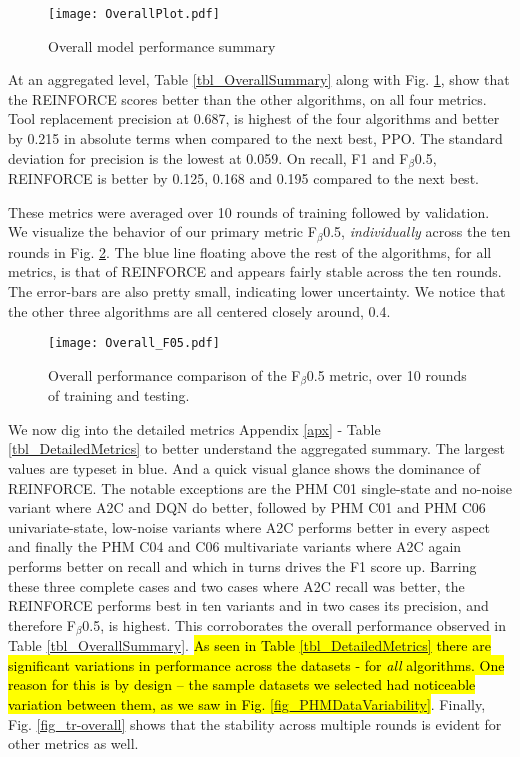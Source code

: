 \documentclass[referee, sn-mathphys-num]{sn-jnl}
\newcommand{\hlc}[2][cyan!17]{{\colorlet{foo}{#1}\sethlcolor{foo}\hl{#2}}}
\begin{document}
	\begin{figure}[hbt!]
		\centering
		\texttt{[image: OverallPlot.pdf]}  
		\caption{Overall model performance summary}
		\label{fig_OverallSummary}
	\end{figure}
	At an aggregated level, Table {\ref{tbl_OverallSummary}} along with Fig. {\ref{fig_OverallSummary}}, show that the REINFORCE scores better than the other algorithms, on all four metrics. Tool replacement precision at 0.687, is highest of the four algorithms and better by 0.215 in absolute terms when compared to the next best, PPO. The standard deviation for precision is the lowest at 0.059. On recall, F1 and F$_\beta$0.5, REINFORCE is better by 0.125, 0.168 and 0.195 compared to the next best.
	
	These metrics were averaged over 10 rounds of training followed by validation. We visualize the behavior of our primary metric F$_\beta$0.5, \textit{individually} across the ten rounds in Fig. {\ref{fig_FbetaOverall}}. The blue line floating above the rest of the algorithms, for all metrics, is that of REINFORCE and appears fairly stable across the ten rounds. The error-bars are also pretty small, indicating lower uncertainty. We notice that the other three algorithms are all centered closely around, 0.4.
	\begin{figure}[hbt!]
		\centering
		\texttt{[image: Overall\_F05.pdf]}  
		\caption{Overall performance comparison of the F$_\beta$0.5 metric, over 10 rounds of training and testing.}
		\label{fig_FbetaOverall}
	\end{figure}
	
	We now dig into the detailed metrics Appendix {\ref{apx}} - Table {\ref{tbl_DetailedMetrics}} to better understand the aggregated summary. The largest values are typeset in {\textcolor{dblue}{blue}}. And a quick visual glance shows the dominance of REINFORCE. The notable exceptions are the PHM C01 single-state and no-noise variant where A2C and DQN do better, followed by PHM C01 and PHM C06 univariate-state, low-noise variants where A2C performs better in every aspect and finally the PHM C04 and C06 multivariate variants where A2C again performs better on recall and which in turns drives the F1 score up. Barring these three complete cases and two cases where A2C recall was better, the REINFORCE performs best in ten variants and in two cases its precision, and therefore F$_\beta$0.5, is highest. This corroborates the overall performance observed in Table {\ref{tbl_OverallSummary}}. \hlc{As seen in Table {\ref{tbl_DetailedMetrics}} there are significant variations in performance across the datasets - for \textit{all} algorithms. One reason for this is by design -- the sample datasets we selected had noticeable variation between them, as we saw in Fig. {\ref{fig_PHMDataVariability}}}. Finally, Fig. {\ref{fig_tr-overall}} shows that the stability across multiple rounds is evident for other metrics as well.
	
\end{document}
